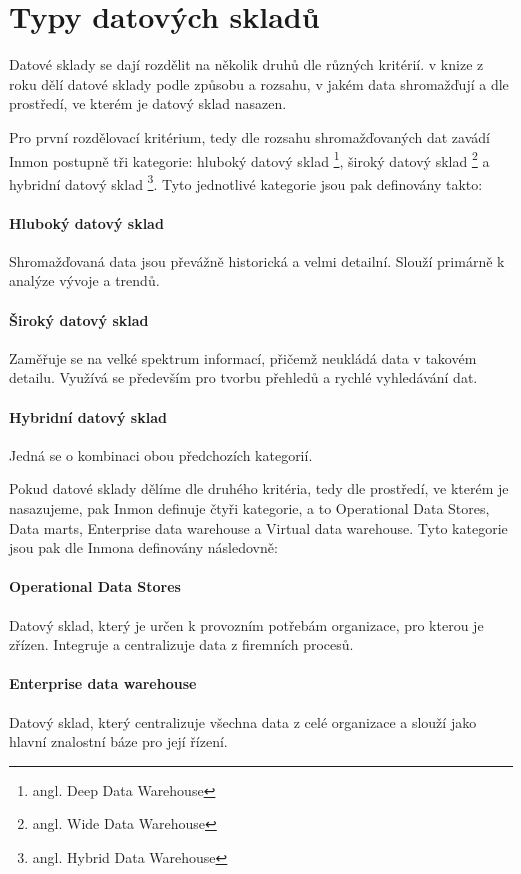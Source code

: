 \documentclass[
  digital,     %
  twoside,     %
  lof,         %
  lot,         %
]{fithesis4}
\begin{document}
\section{Typy datových skladů}
\label{dwh_types}
Datové sklady se dají rozdělit na několik druhů dle různých kritérií. \citeauthor{Inmon2005}
v knize  z roku \citeyear{Inmon2005} dělí datové sklady podle způsobu a rozsahu,
v jakém data shromažďují a dle prostředí, ve kterém je datový sklad nasazen.

Pro první rozdělovací kritérium, tedy dle rozsahu shromažďovaných dat zavádí Inmon
postupně tři kategorie: hluboký datový sklad \footnote{angl. Deep Data Warehouse}, široký
datový sklad \footnote{angl. Wide Data Warehouse} a hybridní datový sklad \footnote{angl. Hybrid Data
Warehouse}. Tyto jednotlivé kategorie jsou pak definovány takto:
\paragraph{Hluboký datový sklad}
Shromažďovaná data jsou převážně historická a velmi detailní. Slouží primárně k analýze vývoje a trendů.
\paragraph{Široký datový sklad}
Zaměřuje se na velké spektrum informací, přičemž neukládá data v takovém detailu. Využívá se především pro tvorbu přehledů a rychlé vyhledávání dat.
\paragraph{Hybridní datový sklad}
Jedná se o kombinaci obou předchozích kategorií.

 \vspace{5mm}
Pokud datové sklady dělíme dle druhého kritéria, tedy dle prostředí, ve kterém je
nasazujeme, pak Inmon definuje čtyři kategorie, a to Operational Data Stores, Data marts,
Enterprise data warehouse a Virtual data warehouse. Tyto kategorie jsou pak dle Inmona definovány následovně:

\paragraph{Operational Data Stores}
Datový sklad, který je určen k provozním potřebám organizace, pro kterou je zřízen. Integruje a centralizuje data z firemních procesů.
\paragraph{Enterprise data warehouse}
Datový sklad, který centralizuje všechna data z celé organizace a slouží jako hlavní znalostní báze pro její řízení.
\end{document}
